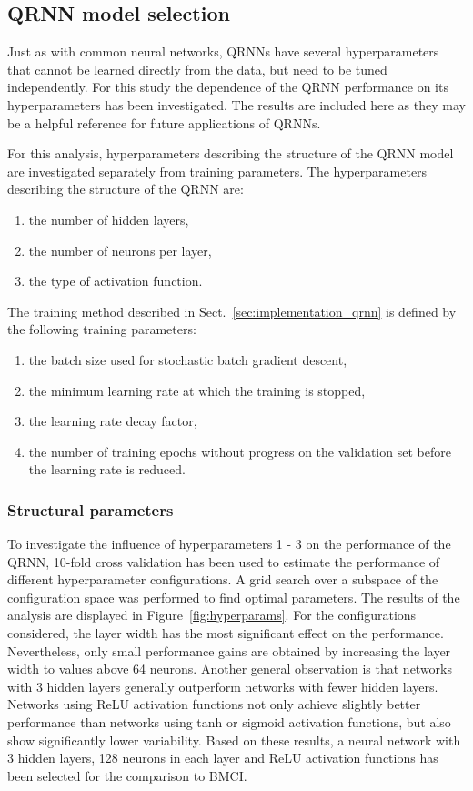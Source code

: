 \documentclass[journal abbreviation, manuscript]{copernicus}
\begin{document}
\subsection{QRNN model selection}

Just as with common neural networks, QRNNs have several hyperparameters that cannot
be learned directly from the data, but need to be tuned independently. For this
study the dependence of the QRNN performance on its hyperparameters has been
investigated. The results are included here as they may be a helpful reference
for future applications of QRNNs.

For this analysis, hyperparameters describing the structure of the QRNN model
are investigated separately from training parameters. The hyperparameters
describing the structure of the QRNN are:
\begin{enumerate}
  \item the number of hidden layers,
  \item the number of neurons per layer,
  \item the type of activation function.
  \setcounter{enumic}{\value{enumi}}
\end{enumerate}
The training method  described in Sect.~\ref{sec:implementation_qrnn} is
defined by the following training parameters:
\begin{enumerate}
  \setcounter{enumi}{\value{enumic}}
  \item the batch size used for stochastic batch gradient descent,
  \item the minimum learning rate at which the training is stopped,
  \item the learning rate decay factor,
  \item the number of training epochs without progress on the validation set
     before the learning rate is reduced.
\end{enumerate}

\subsubsection{Structural parameters}

  To investigate the influence of hyperparameters 1 - 3 on the performance of
the QRNN, 10-fold cross validation has been used to estimate the performance of
different hyperparameter configurations. A grid search over a subspace of the
configuration space was performed to find optimal parameters. The
results of the analysis are displayed in Figure~\ref{fig:hyperparams}. For the
configurations considered, the layer width has the most significant effect on
the performance. Nevertheless, only small performance gains are obtained by
increasing the layer width to values above 64 neurons. Another general observation is that
networks with 3 hidden layers generally outperform networks with fewer hidden
layers. Networks using ReLU activation functions not only achieve slightly better
performance than networks using tanh or sigmoid activation functions, but also
show significantly lower variability. Based on these results, a neural network
with 3 hidden layers, 128 neurons in each layer and ReLU activation functions
 has been selected for the comparison to BMCI.
\end{document}
